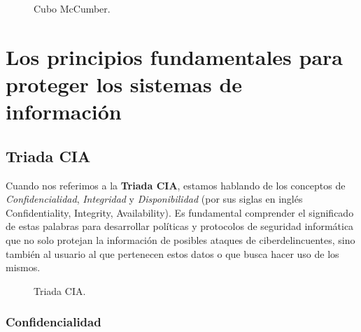 \documentclass[a4paper]{article} %
\begin{document}
\begin{figure}[h] %
    \begin{center}
    \setlength{\fboxsep}{0.2em} %
    \end{center}
    \captionsetup{labelfont=bf} %
    \caption{Cubo McCumber.}
\end{figure}

\vspace{3cm}

\section{Los principios fundamentales para proteger los sistemas de información}

    \subsection{Triada CIA}

    \vspace{0.2cm}

    Cuando nos referimos a la \textbf{Triada CIA}, estamos hablando de los conceptos de \textit{Confidencialidad}, \textit{Integridad} y \textit{Disponibilidad} (por sus siglas en inglés Confidentiality, Integrity, Availability). Es fundamental comprender el significado de estas palabras para desarrollar políticas y protocolos de seguridad informática que no solo protejan la información de posibles ataques de ciberdelincuentes, sino también al usuario al que pertenecen estos datos o que busca hacer uso de los mismos.

    \begin{figure}[h] %
        \begin{center}
        \setlength{\fboxsep}{0.2em} %
        \end{center}
        \captionsetup{labelfont=bf} %
        \caption{Triada CIA.}
    \end{figure}

        \subsubsection{Confidencialidad}
        
\end{document}
